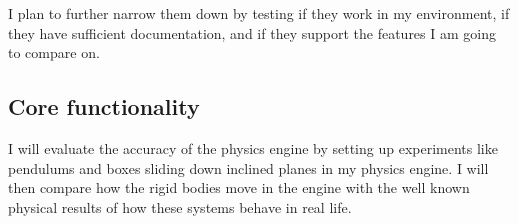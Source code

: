 \documentclass[12pt]{article}
\begin{document}
\begin{table}[h]
    \centering
\end{table}

I plan to further narrow them down by testing if they work in my environment, 
if they have sufficient documentation, 
and if they support the features I am going to compare on.

\subsection{Core functionality}

I will evaluate the accuracy of the physics engine by setting up experiments like 
pendulums and boxes sliding down inclined planes in my physics engine. 
I will then compare how the rigid bodies move in the engine with the well known 
physical results of how these systems behave in real life.
\end{document}
